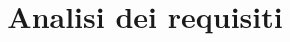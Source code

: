 \documentclass[12pt]{article}
\title{Analisi dei requisiti}
\begin{document}
	\makefirstpage
	
	
	\clearpage
	
	\tableofcontents
	\clearpage
	

	
\end{document}
